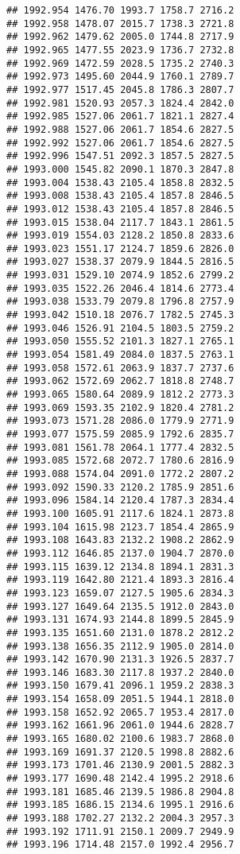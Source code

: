 \documentclass[
]{article}
\begin{document}
\begin{verbatim}
## 1992.954 1476.70 1993.7 1758.7 2716.2
## 1992.958 1478.07 2015.7 1738.3 2721.8
## 1992.962 1479.62 2005.0 1744.8 2717.9
## 1992.965 1477.55 2023.9 1736.7 2732.8
## 1992.969 1472.59 2028.5 1735.2 2740.3
## 1992.973 1495.60 2044.9 1760.1 2789.7
## 1992.977 1517.45 2045.8 1786.3 2807.7
## 1992.981 1520.93 2057.3 1824.4 2842.0
## 1992.985 1527.06 2061.7 1821.1 2827.4
## 1992.988 1527.06 2061.7 1854.6 2827.5
## 1992.992 1527.06 2061.7 1854.6 2827.5
## 1992.996 1547.51 2092.3 1857.5 2827.5
## 1993.000 1545.82 2090.1 1870.3 2847.8
## 1993.004 1538.43 2105.4 1858.8 2832.5
## 1993.008 1538.43 2105.4 1857.8 2846.5
## 1993.012 1538.43 2105.4 1857.8 2846.5
## 1993.015 1538.04 2117.7 1843.1 2861.5
## 1993.019 1554.03 2128.2 1850.8 2833.6
## 1993.023 1551.17 2124.7 1859.6 2826.0
## 1993.027 1538.37 2079.9 1844.5 2816.5
## 1993.031 1529.10 2074.9 1852.6 2799.2
## 1993.035 1522.26 2046.4 1814.6 2773.4
## 1993.038 1533.79 2079.8 1796.8 2757.9
## 1993.042 1510.18 2076.7 1782.5 2745.3
## 1993.046 1526.91 2104.5 1803.5 2759.2
## 1993.050 1555.52 2101.3 1827.1 2765.1
## 1993.054 1581.49 2084.0 1837.5 2763.1
## 1993.058 1572.61 2063.9 1837.7 2737.6
## 1993.062 1572.69 2062.7 1818.8 2748.7
## 1993.065 1580.64 2089.9 1812.2 2773.3
## 1993.069 1593.35 2102.9 1820.4 2781.2
## 1993.073 1571.28 2086.0 1779.9 2771.9
## 1993.077 1575.59 2085.9 1792.6 2835.7
## 1993.081 1561.78 2064.1 1777.4 2832.5
## 1993.085 1572.68 2072.7 1780.6 2816.9
## 1993.088 1574.04 2091.0 1772.2 2807.2
## 1993.092 1590.33 2120.2 1785.9 2851.6
## 1993.096 1584.14 2120.4 1787.3 2834.4
## 1993.100 1605.91 2117.6 1824.1 2873.8
## 1993.104 1615.98 2123.7 1854.4 2865.9
## 1993.108 1643.83 2132.2 1908.2 2862.9
## 1993.112 1646.85 2137.0 1904.7 2870.0
## 1993.115 1639.12 2134.8 1894.1 2831.3
## 1993.119 1642.80 2121.4 1893.3 2816.4
## 1993.123 1659.07 2127.5 1905.6 2834.3
## 1993.127 1649.64 2135.5 1912.0 2843.0
## 1993.131 1674.93 2144.8 1899.5 2845.9
## 1993.135 1651.60 2131.0 1878.2 2812.2
## 1993.138 1656.35 2112.9 1905.0 2814.0
## 1993.142 1670.90 2131.3 1926.5 2837.7
## 1993.146 1683.30 2117.8 1937.2 2840.0
## 1993.150 1679.41 2096.1 1959.2 2838.3
## 1993.154 1658.09 2051.5 1944.1 2818.0
## 1993.158 1652.92 2065.7 1953.4 2817.0
## 1993.162 1661.96 2061.0 1944.6 2828.7
## 1993.165 1680.02 2100.6 1983.7 2868.0
## 1993.169 1691.37 2120.5 1998.8 2882.6
## 1993.173 1701.46 2130.9 2001.5 2882.3
## 1993.177 1690.48 2142.4 1995.2 2918.6
## 1993.181 1685.46 2139.5 1986.8 2904.8
## 1993.185 1686.15 2134.6 1995.1 2916.6
## 1993.188 1702.27 2132.2 2004.3 2957.3
## 1993.192 1711.91 2150.1 2009.7 2949.9
## 1993.196 1714.48 2157.0 1992.4 2956.7

\end{verbatim}
\end{document}
